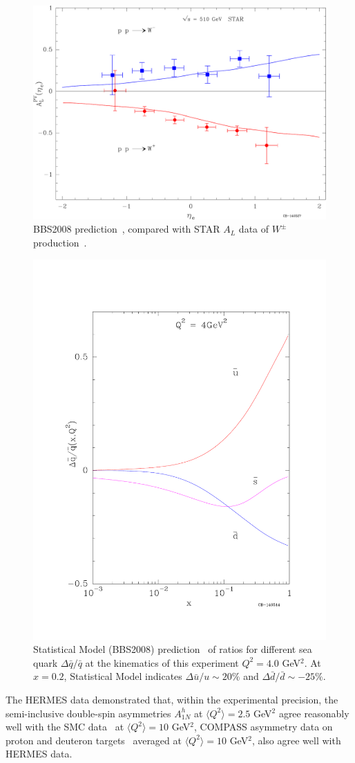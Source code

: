 \begin{figure} [htbp]
  \centering
    \includegraphics[width=0.70\linewidth]{figs_xj/BBS2008_STARW_submitted.pdf} 
  \caption{\label{fig:STAR_WBBS2008} BBS2008 prediction~\cite{Bourrely2013296}, compared with STAR  $A_L$ data of $W^\pm$ production~\cite{Adamczyk:2014xyw}. }
\end{figure}

\begin{figure} [htbp]
  \centering
    \includegraphics[width=0.49\linewidth]{figs_xj/BBS_deltaqbaroqbar.pdf} 
  \caption{\label{fig:BBS_deltaqoq} Statistical Model (BBS2008) prediction~\cite{Bourrely200739} of ratios for different sea quark $\Delta \bar{q}/\bar{q}$ at the kinematics of this experiment $Q^2=4.0$ GeV$^2$. At $x=0.2$,  Statistical Model indicates $\Delta \bar{u}/u \sim 20 \%$ and $\Delta \bar{d}/\bar{d} \sim -25 \%$.
  }
\end{figure}

The HERMES data demonstrated that, within the experimental precision, 
the semi-inclusive double-spin asymmetries $A_{1N}^h$ 
at $\langle Q^2 \rangle=2.5$ GeV$^2$ 
agree reasonably well with the 
SMC data~\cite{Adeva:1997qz} at $\langle Q^2 \rangle=10$ GeV$^2$, COMPASS 
asymmetry data on proton and deuteron targets~\cite{Alekseev:2010ub}
averaged at $\langle Q^2 \rangle=10$ GeV$^2$, also agree well with HERMES data.

